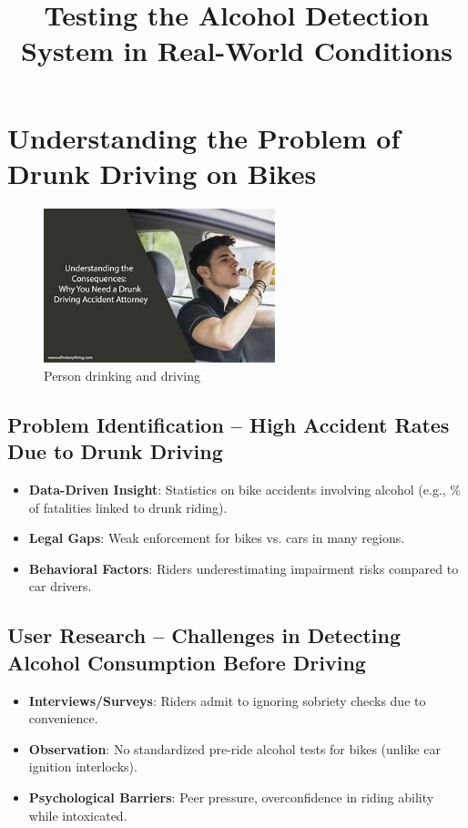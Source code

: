 \documentclass{article}
\title{\textbf{Testing the Alcohol Detection System in Real-World Conditions}}
\author{}
\date{}
\begin{document}
\maketitle

\section{Understanding the Problem of Drunk Driving on Bikes}
\begin{figure}[h!]
    \centering
    \includegraphics[width=0.6\textwidth]{ac/1.jpg}
    \caption{Person drinking and driving}
    \label{fig:Drinking_water}
\end{figure}

\subsection{Problem Identification -- High Accident Rates Due to Drunk Driving}
\begin{itemize}
    \item \textbf{Data-Driven Insight}: Statistics on bike accidents involving alcohol (e.g., \% of fatalities linked to drunk riding).
    \item \textbf{Legal Gaps}: Weak enforcement for bikes vs. cars in many regions.
    \item \textbf{Behavioral Factors}: Riders underestimating impairment risks compared to car drivers.
\end{itemize}

\subsection{User Research -- Challenges in Detecting Alcohol Consumption Before Driving}
\begin{itemize}
    \item \textbf{Interviews/Surveys}: Riders admit to ignoring sobriety checks due to convenience.
    \item \textbf{Observation}: No standardized pre-ride alcohol tests for bikes (unlike car ignition interlocks).
    \item \textbf{Psychological Barriers}: Peer pressure, overconfidence in riding ability while intoxicated.
\end{itemize}
\end{document}
